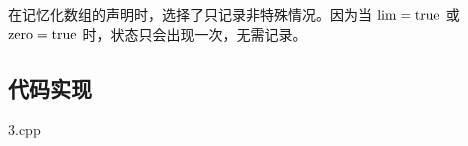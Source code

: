 在记忆化数组的声明时，选择了只记录非特殊情况。因为当 \(\rm lim=true\) 或
\(\rm zero=true\) 时，状态只会出现一次，无需记录。

\subsection{代码实现}

3.cpp





